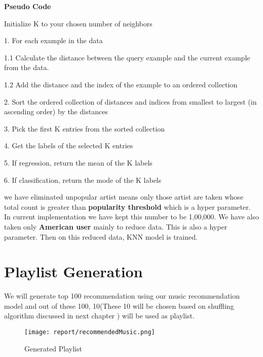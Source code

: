 \textbf{Pseudo Code}

Initialize K to your chosen number of neighbors

1. For each example in the data

1.1 Calculate the distance between the query example and the current example from the data.

1.2 Add the distance and the index of the example to an ordered collection

2. Sort the ordered collection of distances and indices from smallest to largest (in ascending order) by the distances

3. Pick the first K entries from the sorted collection

4. Get the labels of the selected K entries

5. If regression, return the mean of the K labels

6. If classification, return the mode of the K labels

we have eliminated unpopular artist means only those artist are taken whose total count is greater than \textbf{popularity threshold} which is a hyper parameter. In current implementation we have kept this number to be 1,00,000. We have also taken only \textbf{American user} mainly to reduce data. This is also a hyper parameter.
Then on this reduced data, KNN model is trained.

\section{Playlist Generation}
We will generate top 100 recommendation using our music recommendation model and out of these 100, 10(These 10 will be chosen based on shuffling algorithm discussed in next chapter ) will be used as playlist. 

\begin{figure}
\texttt{[image: report/recommendedMusic.png]}
\caption{Generated Playlist}
\label{chap0Fig:2}
\end{figure}